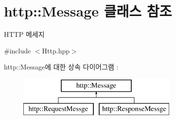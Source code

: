 \hypertarget{classhttp_1_1_message}{}\section{http\+:\+:Message 클래스 참조}
\label{classhttp_1_1_message}


H\+T\+TP 메세지  




{\ttfamily \#include $<$Http.\+hpp$>$}

http\+:\+:Message에 대한 상속 다이어그램 \+: \begin{figure}[H]
\begin{center}
\leavevmode
\includegraphics[height=2.000000cm]{classhttp_1_1_message}
\end{center}
\end{figure}

